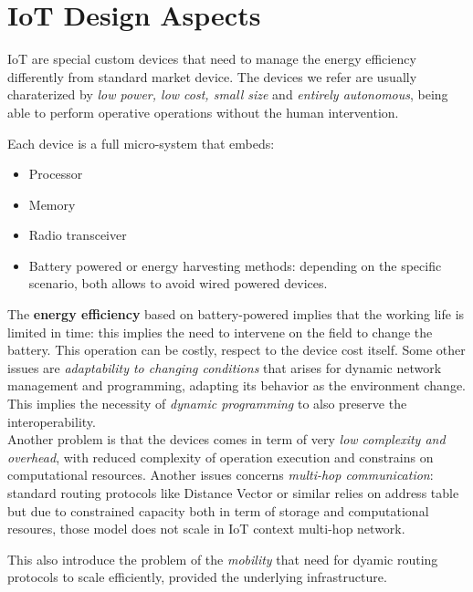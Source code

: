 \documentclass[10pt,a4paper]{report}
\theoremstyle{definition}
\begin{document}
\chapter{IoT Design Aspects}\label{sec:iot-design-aspects}
IoT are special custom devices that need to manage the energy efficiency differently from standard market device.
The devices we refer are usually charaterized by \textit{low power, low cost, small size} and \textit{entirely autonomous}, being able to perform operative operations without the human intervention.

Each device is a full micro-system that embeds:
\begin{itemize}
	\item 
	Processor
	\item 
	Memory
	\item 
	Radio transceiver
	\item 
	Battery powered or energy harvesting methods: depending on the specific scenario, both allows to avoid wired powered devices.
\end{itemize}

The \textbf{energy efficiency} based on battery-powered implies that the working life is limited in time: this implies the need to intervene on the field to change the battery. This operation can be costly, respect to the device cost itself.
Some other issues are \textit{adaptability to changing conditions} that arises for dynamic network management and programming, adapting its behavior as the environment change. This implies the necessity of \textit{dynamic programming} to also preserve the interoperability.\\
Another problem is that the devices comes in term of very \textit{low complexity and overhead}, with reduced complexity of operation execution and constrains on computational resources.
Another issues concerns \textit{multi-hop communication}: standard routing protocols like Distance Vector or similar relies on address table but due to constrained capacity both in term of storage and computational resoures, those model does not scale in IoT context multi-hop network.

This also introduce the problem of the \textit{mobility} that need for dyamic routing protocols to scale efficiently, provided the underlying infrastructure.
\end{document}
